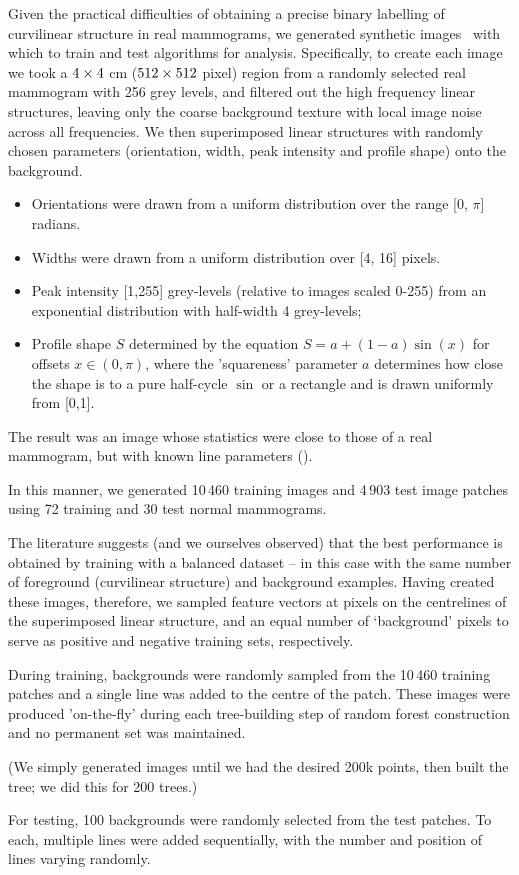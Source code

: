 \label{s:dataset_synthmamm}
%
Given the practical difficulties of obtaining a precise binary labelling of curvilinear structure in real mammograms, we generated synthetic images~\cite{Berks_PhD10} with which to train and test algorithms for analysis. Specifically, to create each image we took a $4 \times 4$ cm ($512 \times 512$ pixel) region from a randomly selected real mammogram with 256 grey levels, and filtered out the high frequency linear structures, leaving only the coarse background texture with local image noise across all frequencies. We then superimposed linear structures with randomly chosen parameters (orientation, width, peak intensity and profile shape) onto the background.

\begin{itemize}
\item Orientations were drawn from a uniform distribution over the range [0, $\pi$] radians.

\item Widths were drawn from a uniform distribution over [4, 16] pixels.

\item Peak intensity [1,255] grey-levels (relative to images scaled 0-255) from an exponential distribution with half-width 4 grey-levels;

\item Profile shape $S$ determined by the equation $S = a + (1-a) \sin(x)$ for offsets $x \in (0,\pi)$, where the 'squareness' parameter $a$ determines how close the shape is to a pure half-cycle $\sin$ or a rectangle and is drawn uniformly from [0,1].
\end{itemize}

The result was an image whose statistics were close to those of a real mammogram, but with known line parameters ().

In this manner, we generated 10\,460 training images and 4\,903 test image patches using 72 training and 30 test normal mammograms.

The literature suggests (and we ourselves observed) that the best performance is obtained by training with a balanced dataset -- in this case with the same number of foreground (curvilinear structure) and background examples. Having created these images, therefore, we sampled feature vectors at pixels on the centrelines of the superimposed linear structure, and an equal number of `background' pixels to serve as positive and negative training sets, respectively. 

During training, backgrounds were randomly sampled from the 10\,460 training patches and a single line was added to the centre of the patch. These images were produced 'on-the-fly' during each tree-building step of random forest construction and no permanent set was maintained. 

(We simply generated images until we had the desired 200k points, then built the tree; we did this for 200 trees.)

For testing, 100 backgrounds were randomly selected from the test patches. To each, multiple lines were added sequentially, with the number and position of lines varying randomly.

